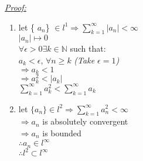 \documentclass[12pt]{article}
\begin{document}
\begin{center}
    
\end{center}
\textit{\underline{\color{red}Proof:}}
\begin{enumerate}
    \item let \{ $a_n$\} $\in l^1 \Rightarrow \sum_{k=1}^{\infty}|a_n|<\infty$\\
    $|a_n|\mapsto 0$\\
    $\forall \epsilon>0 \exists k\in \mathbb{N} $ such that:\\
    $a_k <\epsilon$, $\forall n\geq k$ {\textit{\color{red}(Take $\epsilon=1$)}}\\
    $\Rightarrow a_k<1$\\
    $\Rightarrow a_k^2<|a_k|$\\
    $\sum_{k=1}^{\infty} a_k^2<\sum_{k=1}^{\infty} a_k$
    \item let $\{a_n\} \in l^2\Rightarrow\sum_{k=1}^{\infty} a_n^2<\infty$\\
    $\Rightarrow a_n $ is absolutely convergent\\
    $\Rightarrow a_n$ is bounded\\
    $\therefore a_n \in l^\infty$\\
    $\therefore l^2 \subset l^\infty$
\end{enumerate}
\end{document}
